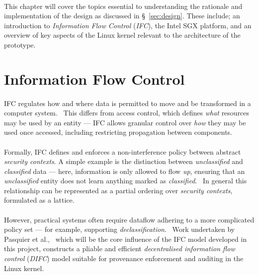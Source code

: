 
\paragraph{} This chapter will cover the topics essential to understanding the rationale and implementation of the design as discussed in §~\ref{sec:design}. These include; an introduction to \textit{Information Flow Control} (\textit{IFC}), the Intel SGX platform, and an overview of key aspects of the Linux kernel relevant to the architecture of the prototype.



\section{Information Flow Control}
\label{sec:ifc}

\paragraph{} IFC regulates how and where data is permitted to move and be transformed in a computer system.~\cite{ifc-data-prop} This differs from access control, which defines \textit{what} resources may be used by an entity --- IFC allows granular control over \textit{how} they may be used once accessed, including restricting propagation between components. 

\paragraph{} Formally, IFC defines and enforces a non-interference policy between abstract \textit{security contexts}. A simple example is the distinction between \textit{unclassified} and \textit{classified} data --- here, information is only allowed to flow \textit{up}, ensuring that an \textit{unclassified} entity does not learn anything marked as \textit{classified}.~\cite{Bell1973SecureCS} In general this relationship can be represented as a partial ordering over \textit{security contexts}, formulated as a lattice.~\cite{ifc-lattice}

\paragraph{} However, practical systems often require dataflow adhering to a more complicated policy set --- for example, supporting \textit{declassification}.~\cite{10.5555/794199.795122} Work undertaken by Pasquier et al.,~\cite{camflow} which will be the core influence of the IFC model developed in this project, constructs a pliable and efficient \textit{decentralised information flow control} (\textit{DIFC}) model suitable for provenance enforcement and auditing in the Linux kernel.

